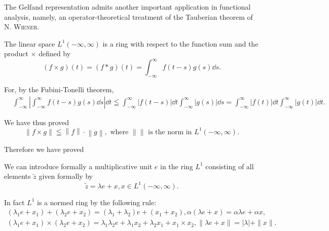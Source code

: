 The Gelfand representation admits another important application in functional analysis, namely, an operator-theoretical treatment of the Tauberian theorem of N. \textsc{Wiener}. 

The linear space $L^{1}(-\infty,\infty)$ is a ring with respect to the function sum and the product $\times$ defined by 
\begin{equation}\label{eq:XI.16.1}
(f \times g) (t) = (f * g) (t) = \int_{- \infty} ^{\infty} f (t - s) g (s) \dd s.
\end{equation}

For, by the Fubini-Tonelli theorem, 
\[
\begin{aligned}
&\int_{- \infty} ^{\infty} \left| \int_{- \infty} ^{\infty} f (t - s) g (s) \dd s \right| \dd t  \leqq \int_{- \infty} ^{\infty} | f (t - s) | \dd t \int_{- \infty} ^{\infty} | g (s) | \dd s = \int_{- \infty} ^{\infty} | f (t) | \dd t \int_{- \infty} ^{\infty} | g (t) | \dd t.
\end{aligned}
\]

We have thus proved 
\begin{equation}\label{eq:XI.16.2}
\left\| f \times g \right\| \leqq \left\| f \right\| \cdot \left\| g \right\|, \text{ where } \| \| \text{ is the norm in } L ^{1} (- \infty , \infty).
\end{equation}

Therefore we have proved 

\begin{proposition}\label{prop:XI.16.Proposition.1} We can introduce formally a multiplicative unit $e$ in the ring $L^{1}$ consisting of all elements $\tilde{z}$ given formally by 
\begin{equation}\label{eq:XI.16.3}
\tilde {z} = \lambda e + x, x \in L ^{1} (- \infty , \infty).
\end{equation}
\end{proposition}

In fact $L^1$ is a normed ring by the following rule: 
\begin{equation}\label{eq:XI.16.4}
\begin{gathered}
(\lambda_{1} e + x _{1}) + (\lambda_{2} e + x _{2}) = (\lambda_{1} + \lambda_{2}) e + (x _{1} + x _{2}), \alpha (\lambda e + x) = \alpha \lambda e + \alpha x,
\\
(\lambda_{1} e + x _{1}) \times (\lambda_{2} e + x _{2}) = \lambda_{1} \lambda_{2} e + \lambda_{1} x _{2} + \lambda_{2} x _{1} + x _{1} \times x _{2}, \| \lambda e + x \| = | \lambda | + \| x \|.
\end{gathered}
\end{equation}


